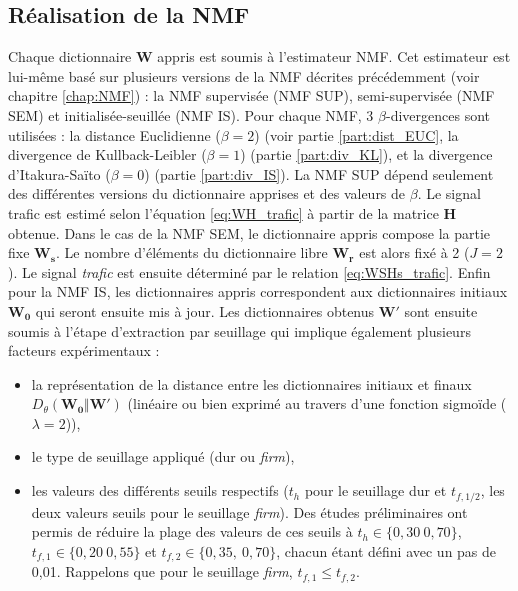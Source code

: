 \subsection{Réalisation de la NMF}

Chaque dictionnaire $\mathbf{W}$ appris est soumis à l'estimateur NMF. Cet estimateur est lui-même basé sur plusieurs versions de la NMF décrites précédemment (voir chapitre \ref{chap:NMF})  : la NMF supervisée (NMF SUP), semi-supervisée (NMF SEM) et initialisée-seuillée (NMF IS). Pour chaque NMF, 3 $\beta$-divergences sont utilisées : la distance Euclidienne ($\beta = 2$) (voir partie \ref{part:dist_EUC}, la divergence de Kullback-Leibler ($\beta = 1$) (partie \ref{part:div_KL}), et la divergence d'Itakura-Saïto ($\beta = 0$) (partie \ref{part:div_IS}). La NMF SUP dépend seulement des différentes versions du dictionnaire apprises et des valeurs de $\beta$. Le signal trafic est estimé selon l'équation \ref{eq:WH_trafic} à partir de la matrice $\mathbf{H}$ obtenue.
Dans le cas de la NMF SEM, le dictionnaire appris compose la partie fixe $\mathbf{W_s}$. Le nombre d'éléments du dictionnaire libre $\mathbf{W_r}$ est alors fixé à 2 ($J = 2$). Le signal \textit{trafic} est ensuite déterminé par le relation \ref{eq:WSHs_trafic}. 
Enfin pour la NMF IS, les dictionnaires appris correspondent aux dictionnaires initiaux $\mathbf{W_0}$ qui seront ensuite mis à jour. Les dictionnaires obtenus $\mathbf{W'}$ sont ensuite soumis à l'étape d'extraction par seuillage qui implique également plusieurs facteurs expérimentaux : 

\begin{itemize}
\item la représentation de la distance entre les dictionnaires initiaux et finaux $D_{\theta}(\mathbf{W_0}\Vert \mathbf{W'})$ (linéaire ou bien exprimé au travers d'une fonction sigmoïde ($\lambda = 2$)),
\item le type de seuillage appliqué (dur ou \textit{firm}),
\item les valeurs des différents seuils respectifs ($t_h$ pour le seuillage dur et $t_{f,1/2}$, les deux valeurs seuils pour le seuillage \textit{firm}). Des études préliminaires ont permis de réduire la plage des valeurs de ces seuils à $t_h \in \lbrace 0,30~0,70 \rbrace$, $t_{f,1} \in \lbrace 0,20~0,55 \rbrace$ et $t_{f,2} \in \lbrace 0,35,~0,70 \rbrace$, chacun étant défini avec un pas de 0,01. Rappelons que pour le seuillage \textit{firm}, $t_{f,1} \leq t_{f,2}$.
\end{itemize}

